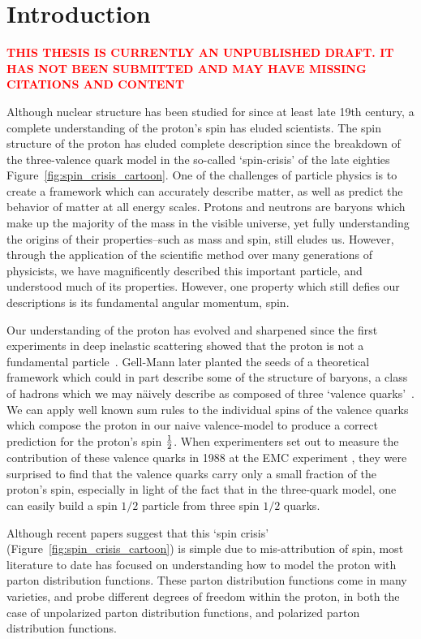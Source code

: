 \chapter{Introduction}

\textbf{\textcolor{red}{THIS THESIS IS CURRENTLY AN UNPUBLISHED DRAFT. IT HAS
NOT BEEN SUBMITTED AND MAY HAVE MISSING CITATIONS AND CONTENT}}

Although nuclear structure has been studied for since at least late 19th
century, a complete understanding of the proton's spin has eluded scientists.
The spin structure of the proton has eluded complete description since the
breakdown of the three-valence quark model in the so-called `spin-crisis' of the
late eighties Figure~\ref{fig:spin_crisis_cartoon}.  One of the challenges of
particle physics is to create a framework which can accurately describe matter,
as well as predict the behavior of matter at all energy scales. Protons and
neutrons are baryons which make up the majority of the mass in the visible
universe, yet fully understanding the origins of their properties--such as
mass and spin, still eludes us. However, through the application of the
scientific method over many generations of physicists, we have magnificently
described this important particle, and understood much of its properties.
However, one property which still defies our descriptions is its fundamental
angular momentum, spin.
	
Our understanding of the proton has evolved and sharpened since the first
experiments in deep inelastic scattering showed that the proton is not a
fundamental particle~\cite{Breidenbach1969}. Gell-Mann later planted the seeds
of a theoretical framework which could in part describe some of the structure of
baryons, a class of hadrons which we may n{\"a}ively describe as composed of three
`valence quarks'~\cite{Bjorken1969}. We can apply well known sum rules to the
individual spins of the valence quarks which compose the proton in our naive
valence-model to produce a correct prediction for the proton's spin
${1}\over{2}$. When experimenters set out to measure the contribution of these
valence quarks in 1988 at the EMC experiment \cite{Ashman1988}, they were
surprised to find that the valence quarks carry only a small fraction of the
proton's spin, especially in light of the fact that in the three-quark model,
one can easily build a spin $1/2$ particle from three spin $1/2$ quarks. 

Although recent papers \cite{Povh2016} suggest that this `spin crisis'
(Figure~\ref{fig:spin_crisis_cartoon}) is simple due to mis-attribution of spin,
most literature to date has focused on understanding how to model the proton
with parton distribution functions. These parton distribution functions come in
many varieties, and probe different degrees of freedom within the proton, in
both the case of unpolarized parton distribution functions, and polarized parton
distribution functions. 

